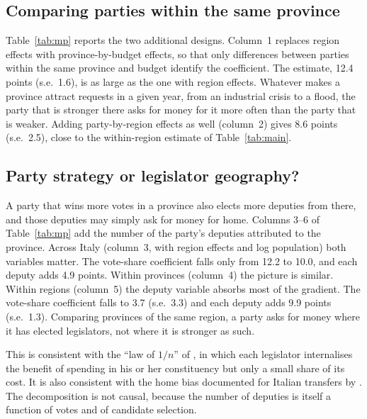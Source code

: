 \documentclass[12pt]{article}
\begin{document}
\subsection{Comparing parties within the same province}

Table~\ref{tab:mp} reports the two additional designs. Column~1 replaces region effects with province-by-budget effects, so that only differences between parties within the same province and budget identify the coefficient. The estimate, 12.4 points (s.e.\ 1.6), is as large as the one with region effects. Whatever makes a province attract requests in a given year, from an industrial crisis to a flood, the party that is stronger there asks for money for it more often than the party that is weaker. Adding party-by-region effects as well (column~2) gives 8.6 points (s.e.\ 2.5), close to the within-region estimate of Table~\ref{tab:main}.

\subsection{Party strategy or legislator geography?}

A party that wins more votes in a province also elects more deputies from there, and those deputies may simply ask for money for home. Columns 3--6 of Table~\ref{tab:mp} add the number of the party's deputies attributed to the province. Across Italy (column~3, with region effects and log population) both variables matter. The vote-share coefficient falls only from 12.2 to 10.0, and each deputy adds 4.9 points. Within provinces (column~4) the picture is similar. Within regions (column~5) the deputy variable absorbs most of the gradient. The vote-share coefficient falls to 3.7 (s.e.\ 3.3) and each deputy adds 9.9 points (s.e.\ 1.3). Comparing provinces of the same region, a party asks for money where it has elected legislators, not where it is stronger as such.

This is consistent with the ``law of $1/n$'' of \citet{weingast1981}, in which each legislator internalises the benefit of spending in his or her constituency but only a small share of its cost. It is also consistent with the home bias documented for Italian transfers by \citet{carozzi2016}. The decomposition is not causal, because the number of deputies is itself a function of votes and of candidate selection.
\end{document}
